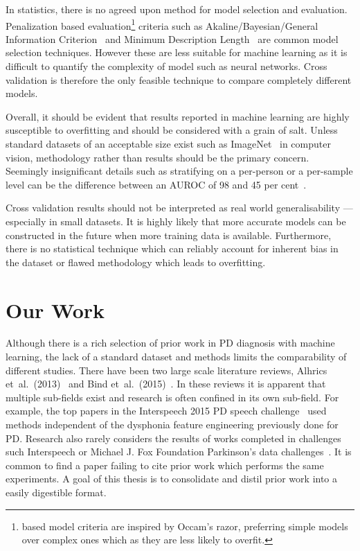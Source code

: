 \documentclass[12pt, twoside]{book}
\renewcommand\emph[1]{\textit{\color{USred}{#1}}}
\begin{document}
In statistics, there is no agreed upon method for model selection and evaluation. Penalization based evaluation\footnote{\emph{Penalization} based model criteria are inspired by Occam's razor, preferring simple models over complex ones which as they are less likely to overfit.}  criteria such as Akaline/Bayesian/General Information Criterion~\cite{aicbic,generalinfocriteriongic} and Minimum Description Length~\cite{mindescriptionlength} are common model selection techniques. However these are less suitable for machine learning as it is difficult to quantify the complexity of model such as neural networks. Cross validation is therefore the only feasible technique to compare completely different models. 
 

Overall, it should be evident that results reported in machine learning are highly susceptible to overfitting and should be considered with a grain of salt. Unless standard datasets of an acceptable size exist such as ImageNet~\cite{imagenet} in computer vision, methodology rather than results should be the primary concern. Seemingly insignificant details such as stratifying on a per-person or a per-sample level can be the difference between an AUROC of 98 and 45 per cent~\cite{mpowerneto2017analysis}. 

Cross validation results should not be interpreted as real world generalisability --- especially in small datasets. It is highly likely that more accurate models can be constructed in the future when more training data is available. Furthermore, there is no statistical technique which can reliably account for inherent bias in the dataset or flawed methodology which leads to overfitting.





\chapter{Our Work}
\label{ourwork}
Although there is a rich selection of prior work in PD diagnosis with machine learning, the lack of a standard dataset and methods limits the comparability of different studies. There have been two large scale literature reviews, Alhrics et~al.~(2013)~\cite{review2013} and Bind et~al.~(2015)~\cite{review2015}. In these reviews it is apparent that multiple sub-fields exist and research is often confined in its own sub-field. For example, the top papers in the Interspeech 2015 PD speech challenge~\cite{compareis15pd} used methods independent of the dysphonia feature engineering previously done for PD. Research also rarely considers the results of works completed in challenges such Interspeech or Michael J. Fox Foundation Parkinson's data challenges~\cite{mjfoxchallenge2013}. It is common to find a paper failing to cite prior work which performs the same experiments. A goal of this thesis is to consolidate and distil prior work into a easily digestible format. 
\end{document}
